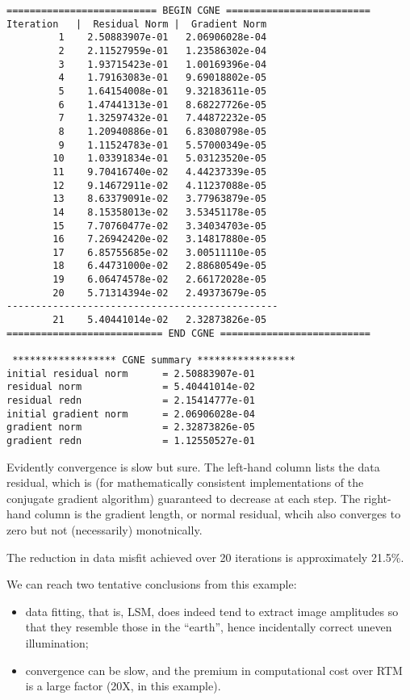 \begin{verbatim}
========================== BEGIN CGNE =========================
Iteration   |  Residual Norm |  Gradient Norm
         1    2.50883907e-01   2.06906028e-04
         2    2.11527959e-01   1.23586302e-04
         3    1.93715423e-01   1.00169396e-04
         4    1.79163083e-01   9.69018802e-05
         5    1.64154008e-01   9.32183611e-05
         6    1.47441313e-01   8.68227726e-05
         7    1.32597432e-01   7.44872232e-05
         8    1.20940886e-01   6.83080798e-05
         9    1.11524783e-01   5.57000349e-05
        10    1.03391834e-01   5.03123520e-05
        11    9.70416740e-02   4.44237339e-05
        12    9.14672911e-02   4.11237088e-05
        13    8.63379091e-02   3.77963879e-05
        14    8.15358013e-02   3.53451178e-05
        15    7.70760477e-02   3.34034703e-05
        16    7.26942420e-02   3.14817880e-05
        17    6.85755685e-02   3.00511110e-05
        18    6.44731000e-02   2.88680549e-05
        19    6.06474578e-02   2.66172028e-05
        20    5.71314394e-02   2.49373679e-05
-----------------------------------------------
        21    5.40441014e-02   2.32873826e-05
=========================== END CGNE ==========================

 ****************** CGNE summary *****************  
initial residual norm      = 2.50883907e-01
residual norm              = 5.40441014e-02
residual redn              = 2.15414777e-01
initial gradient norm      = 2.06906028e-04
gradient norm              = 2.32873826e-05
gradient redn              = 1.12550527e-01
\end{verbatim}
Evidently convergence is slow but sure. The left-hand column lists the
data residual, which is (for mathematically consistent implementations
of the conjugate gradient algorithm) guaranteed to decrease at each
step. The right-hand column is the gradient length, or normal
residual, whcih also converges to zero but not (necessarily)
monotnically. 

The reduction in data misfit achieved over 20 iterations is
approximately 21.5\%.



We can reach two tentative conclusions from this example:
\begin{itemize}
\item data fitting, that is, LSM, does indeed tend to extract image 
  amplitudes so that they resemble those in the ``earth'', hence
  incidentally correct uneven illumination;
\item convergence can be slow, and the premium in computational cost
  over RTM is a large factor (20X, in this example).
\end{itemize}

